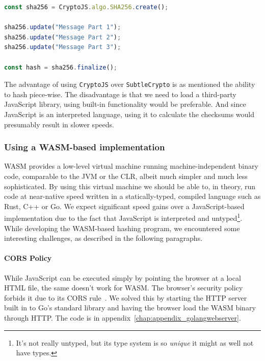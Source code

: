 \begin{lstlisting}[caption={Progressive SHA-256 hashing using CryptoJS},captionpos=b,language=JavaScript,label={lst:cryptojsprogressive}]
const sha256 = CryptoJS.algo.SHA256.create();

sha256.update("Message Part 1");
sha256.update("Message Part 2");
sha256.update("Message Part 3");

const hash = sha256.finalize();
\end{lstlisting}

The advantage of using \texttt{CryptoJS} over \texttt{SubtleCrypto} is as mentioned the ability to hash piece-wise.
The disadvantage is that we need to load a third-party JavaScript library, using built-in functionality would be preferable.
And since JavaScript is an interpreted language, using it to calculate the checksums would presumably result in slower speeds.


\subsubsection{Using a WASM-based implementation}
\label{subsubsec:wasmhashing}
\gls{WASM} provides a low-level virtual machine running machine-independent binary code, comparable to the \gls{JVM} or the \gls{CLR}, albeit much simpler and much less sophisticated.
By using this virtual machine we should be able to, in theory, run code at near-native speed written in a statically-typed, compiled language such as Rust, C++ or Go.
We expect significant speed gains over a JavaScript-based implementation due to the fact that JavaScript is interpreted and untyped\footnote{It's not really untyped, but its type system is so \textit{unique} it might as well not have types.}.
While developing the \gls{WASM}-based hashing program, we encountered some interesting challenges, as described in the following paragraphs.

\paragraph{CORS Policy} While JavaScript can be executed simply by pointing the browser at a local \gls{HTML} file, the same doesn't work for \gls{WASM}.
The browser's security policy forbids it due to its \gls{CORS} rule~\cite{cors}.
We solved this by starting the \gls{HTTP} server built in to Go's standard library and having the browser load the \gls{WASM} binary through \gls{HTTP}.
The code is in appendix~\ref{chap:appendix_golangwebserver}.

